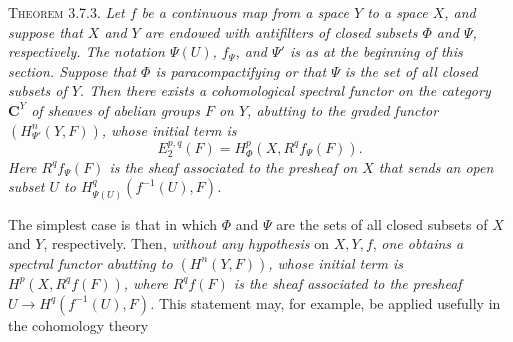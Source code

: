\textsc{Theorem 3.7.3.} \textit{Let $f$ be a continuous map from
a space $Y$ to a space $X$, and suppose that $X$ and $Y$ are endowed with
antifilters of closed subsets $\Phi$ and $\Psi$, respectively. The notation
$\Psi(U)$, $f_\Psi$, and $\Psi'$ is as at the beginning of this section.
Suppose that $\Phi$ is paracompactifying or that $\Psi$ is the set of all
closed subsets of $Y$. Then there exists a cohomological spectral functor on
the category $\mathbf C^Y$ of sheaves of abelian groups $F$ on $Y$, abutting to the
graded functor $(H^n_{\Psi'}(Y,F))$, whose initial term is}
\[
E_2^{p,q}(F)=H^p_\Phi(X,R^qf_\Psi(F)).
\]
\textit{Here $R^qf_\Psi(F)$ is the sheaf associated to the presheaf on $X$
that sends an open subset $U$ to $H^q_{\Psi(U)}(f^{-1}(U),F)$.}

The simplest case is that in which $\Phi$ and $\Psi$ are the sets of all
closed subsets of $X$ and $Y$, respectively. Then, \textit{without any hypothesis} on $X,Y,f$, \textit{one obtains a spectral functor abutting to
$(H^n(Y,F))$, whose initial term is
$H^p(X,R^qf(F))$, where $R^qf(F)$ is the sheaf associated to the presheaf
$U\to H^q(f^{-1}(U),F)$.}
This statement may, for example, be applied usefully in the cohomology theory

